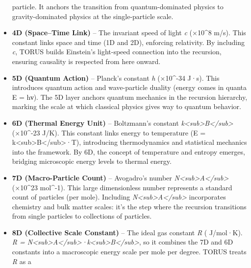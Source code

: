 \documentclass[
]{article}
\begin{document}
\begin{itemize}
  particle. It anchors the transition from quantum-dominated physics to
  gravity-dominated physics at the single-particle scale.
\item
  \textbf{4D (Space--Time Link)} -- The invariant speed of light
  \emph{c} (×10\^{}8 m/s)\hspace{0pt}. This constant links space
  and time (1D and 2D), enforcing relativity. By including \emph{c},
  TORUS builds Einstein's light-speed connection into the recursion,
  ensuring causality is respected from here onward.
\item
  \textbf{5D (Quantum Action)} -- Planck's constant \emph{h} (×10\^{}-34 J·s)\hspace{0pt}. This introduces quantum action and
  wave-particle duality (energy comes in quanta E = hν). The 5D layer
  anchors quantum mechanics in the recursion hierarchy, marking the
  scale at which classical physics gives way to quantum behavior.
\item
  \textbf{6D (Thermal Energy Unit)} -- Boltzmann's constant
  \emph{k\textless sub\textgreater B\textless/sub\textgreater{}} (×10\^{}-23 J/K)\hspace{0pt}. This constant links energy to
  temperature (E =
  k\textless sub\textgreater B\textless/sub\textgreater·T), introducing
  thermodynamics and statistical mechanics into the framework. By 6D,
  the concept of temperature and entropy emerges, bridging microscopic
  energy levels to thermal energy.
\item
  \textbf{7D (Macro-Particle Count)} -- Avogadro's number
  \emph{N\textless sub\textgreater A\textless/sub\textgreater{}} (×10\^{}23 mol\^{}-1)\hspace{0pt}. This large dimensionless number
  represents a standard count of particles (per mole). Including
  \emph{N\textless sub\textgreater A\textless/sub\textgreater{}}
  incorporates chemistry and bulk matter scales: it's the step where the
  recursion transitions from single particles to collections of
  particles.
\item
  \textbf{8D (Collective Scale Constant)} -- The ideal gas constant
  \emph{R} ( J/mol·K)\hspace{0pt}. \emph{R =
  N\textless sub\textgreater A\textless/sub\textgreater·k\textless sub\textgreater B\textless/sub\textgreater{}},
  so it combines the 7D and 6D constants into a macroscopic energy scale
  per mole per degree\hspace{0pt}. TORUS treats \emph{R} as a

\end{itemize}
\end{document}
